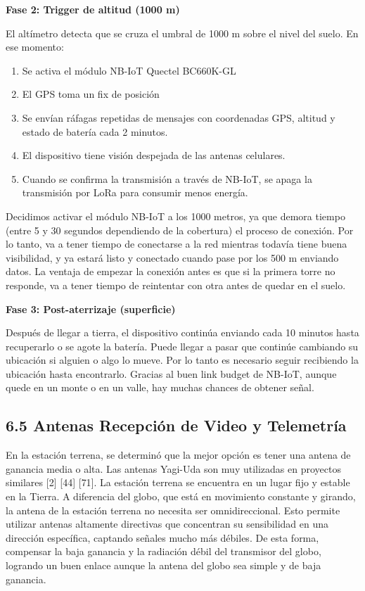 \documentclass[12pt,a4paper]{article}
\begin{document}
\textbf{Fase 2: Trigger de altitud (1000 m)}

El altímetro detecta que se cruza el umbral de 1000 m sobre el nivel del suelo. En ese momento:

\begin{enumerate}
\def\labelenumi{\arabic{enumi}.}
\item
  Se activa el módulo NB-IoT Quectel BC660K-GL
\item
  El GPS toma un fix de posición
\item
  Se envían ráfagas repetidas de mensajes con coordenadas GPS, altitud y estado de batería cada 2 minutos.
\item
  El dispositivo tiene visión despejada de las antenas celulares.
\item
  Cuando se confirma la transmisión a través de NB-IoT, se apaga la transmisión por LoRa para consumir menos energía.
\end{enumerate}

Decidimos activar el módulo NB-IoT a los 1000 metros, ya que demora tiempo (entre 5 y 30 segundos dependiendo de la cobertura) el proceso de conexión. Por lo tanto, va a tener tiempo de conectarse a la red mientras todavía tiene buena visibilidad, y ya estará listo y conectado cuando pase por los 500 m enviando datos. La ventaja de empezar la conexión antes es que si la primera torre no responde, va a tener tiempo de reintentar con otra antes de quedar en el suelo.

\textbf{Fase 3: Post-aterrizaje (superficie)}

Después de llegar a tierra, el dispositivo continúa enviando cada 10 minutos hasta recuperarlo o se agote la batería. Puede llegar a pasar que continúe cambiando su ubicación si alguien o algo lo mueve. Por lo tanto es necesario seguir recibiendo la ubicación hasta encontrarlo. Gracias al buen link budget de NB-IoT, aunque quede en un monte o en un valle, hay muchas chances de obtener señal.

\subsection{6.5 Antenas Recepción de Video y Telemetría}\label{antenas-recepciuxf3n-de-video-y-telemetruxeda}

En la estación terrena, se determinó que la mejor opción es tener una antena de ganancia media o alta. Las antenas Yagi-Uda son muy utilizadas en proyectos similares {[}2{]} {[}44{]} {[}71{]}. La estación terrena se encuentra en un lugar fijo y estable en la Tierra. A diferencia del globo, que está en movimiento constante y girando, la antena de la estación terrena no necesita ser omnidireccional. Esto permite utilizar antenas altamente directivas que concentran su sensibilidad en una dirección específica, captando señales mucho más débiles. De esta forma, compensar la baja ganancia y la radiación débil del transmisor del globo, logrando un buen enlace aunque la antena del globo sea simple y de baja ganancia.
\end{document}
